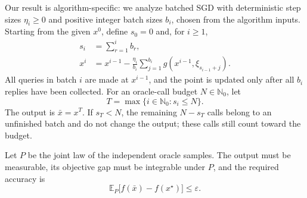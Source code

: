 \documentclass[10pt]{article}
\theoremstyle{definition}
\begin{document}
Our result is algorithm-specific: we analyze batched SGD with deterministic step sizes $\eta_i\geq0$ and positive integer batch sizes $b_i$, chosen from the algorithm inputs. Starting from the given $x^0$, define $s_0=0$ and, for $i\geq1$,
\[
\begin{aligned}
s_i&=\sum_{r=1}^{i}b_r,\\
x^i&=x^{i-1}-\frac{\eta_i}{b_i}
\sum_{j=1}^{b_i}g(x^{i-1},\xi_{s_{i-1}+j}).
\end{aligned}
\]
All queries in batch $i$ are made at $x^{i-1}$, and the point is updated only after all $b_i$ replies have been collected. For an oracle-call budget $N\in\mathbb{N}_0$, let
\[
T=\max\{i\in\mathbb{N}_0:s_i\leq N\}.
\]
The output is $\bar{x}=x^T$. If $s_T<N$, the remaining $N-s_T$ calls belong to an unfinished batch and do not change the output; these calls still count toward the budget.

Let $P$ be the joint law of the independent oracle samples. The output must be measurable, its objective gap must be integrable under $P$, and the required accuracy is
\[
\mathbb{E}_{P}\bigl[f(\bar{x})-f(x^\star)\bigr]\leq\varepsilon.
\]
\end{document}
